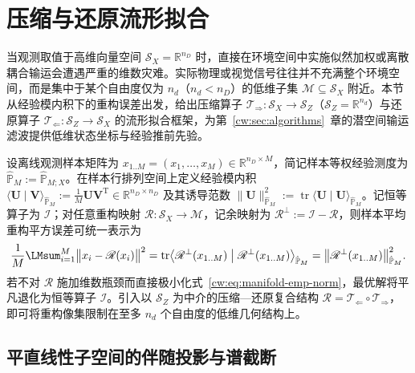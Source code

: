 \section{压缩与还原流形拟合}\label{cw:sec:ml-compress}

当观测取值于高维向量空间 $\mathcal S_X=\mathbb R^{n_D}$ 时，直接在环境空间中实施似然加权或离散耦合输运会遭遇严重的维数灾难。实际物理或视觉信号往往并不充满整个环境空间，而是集中于某个自由度仅为 $n_d$（$n_d<n_D$）的低维子集 $\mathcal M\subseteq\mathcal S_X$ 附近。本节从经验模内积下的重构误差出发，给出压缩算子 $\mathscr T_{\Rightarrow}:\mathcal S_X\to\mathcal S_Z$（$\mathcal S_Z=\mathbb R^{n_d}$）与还原算子 $\mathscr T_{\Leftarrow}:\mathcal S_Z\to\mathcal S_X$ 的流形拟合框架，为第~\ref{cw:sec:algorithms}~章的潜空间输运滤波提供低维状态坐标与经验推前先验。

设离线观测样本矩阵为 $x_{1..M}=(x_1,\dots,x_M)\in\mathbb R^{n_D\times M}$，简记样本等权经验测度为 $\hat{\mathbb P}_M:=\hat{\mathbb P}_{M;X}$。在样本行排列空间上定义经验模内积 $\langle\bm U\mid\bm V\rangle_{\hat{\mathbb P}_M}:=\frac1M\bm U\bm V^{\mathrm T}\in\mathbb R^{n_D\times n_D}$ 及其诱导范数 $\|\bm U\|_{\hat{\mathbb P}_M}^2:=\operatorname{tr}\langle\bm U\mid\bm U\rangle_{\hat{\mathbb P}_M}$。记恒等算子为 $\mathscr I$；对任意重构映射 $\mathscr R:\mathcal S_X\to\mathcal M$，记余映射为 $\mathscr R^{\perp}:=\mathscr I-\mathscr R$，则样本平均重构平方误差可统一表示为
\begin{equation}\label{cw:eq:manifold-emp-norm}
\frac1M\sum_{i=1}^M\bigl\|x_i-\mathscr R(x_i)\bigr\|^2
=\operatorname{tr}\bigl\langle\mathscr R^{\perp}(x_{1..M})\bigm|\mathscr R^{\perp}(x_{1..M})\bigr\rangle_{\hat{\mathbb P}_M}
=\bigl\|\mathscr R^{\perp}(x_{1..M})\bigr\|_{\hat{\mathbb P}_M}^2.
\end{equation}
若不对 $\mathscr R$ 施加维数瓶颈而直接极小化式~\eqref{cw:eq:manifold-emp-norm}，最优解将平凡退化为恒等算子 $\mathscr I$。引入以 $\mathcal S_Z$ 为中介的压缩—还原复合结构 $\mathscr R=\mathscr T_{\Leftarrow}\circ\mathscr T_{\Rightarrow}$，即可将重构像集限制在至多 $n_d$ 个自由度的低维几何结构上。

\subsection{平直线性子空间的伴随投影与谱截断}

